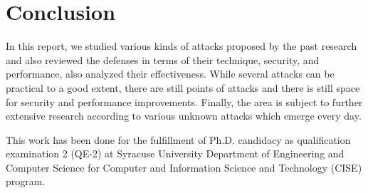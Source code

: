 \section{Conclusion}
In this report, we studied various kinds of attacks proposed by the past research and also reviewed the defenses in terms of their technique, security, and performance, also analyzed their effectiveness. While several attacks can be practical to a good extent, there are still points of attacks and there is still space for security and performance improvements. Finally, the area is subject to further extensive research according to various unknown attacks which emerge every day.

\begin{acks}
	
	This work has been done for the fulfillment of Ph.D. candidacy as qualification examination 2 (QE-2) at Syracuse University Department of Engineering and Computer Science for Computer and Information Science and Technology (CISE) program.
	
	
\end{acks}




